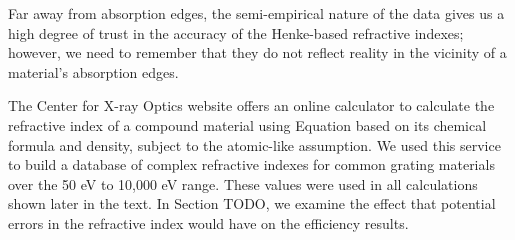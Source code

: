 Far away from absorption edges, the semi-empirical nature of the data gives us a high degree of trust in the accuracy of the Henke-based refractive indexes; however, we need to remember that they do not reflect reality in the vicinity of a material's absorption edges.

The Center for X-ray Optics website \cite{CXR11} offers an online calculator to calculate the refractive index of a compound material using Equation  based on its chemical formula and density, subject to the atomic-like assumption.  We used this service to build a database of complex refractive indexes for common grating materials over the 50 eV to 10,000 eV range.  These values were used in all calculations shown later in the text.  In Section TODO, we examine the effect that potential errors in the refractive index would have on the efficiency results.

